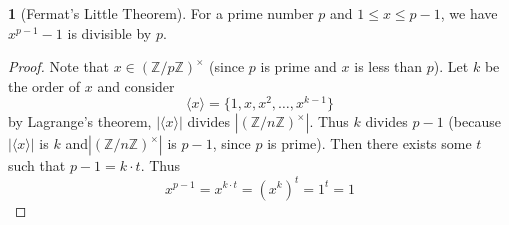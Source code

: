 \documentclass[12pt]{article}
\theoremstyle{definition}
\newtheorem{theorem}{\color{ForestGreen}{\textbf{Theorem}}}
\theoremstyle{definition}
\begin{document}
\begin{theorem}[Fermat's Little Theorem]
	For a prime number $p$ and $1 \leq x \leq p-1$, we have $x^{p-1} - 1$ is divisible by $p$.
\end{theorem}
\begin{proof}
	Note that $x \in (\mathbb{Z}/p \mathbb{Z})^{\times}$ (since $p$ is prime and $x$ is less than $p$). Let $k$ be the order of $x$ and consider 
	\begin{equation}
		\langle x \rangle = \{1,x,x^2,\ldots,x^{k-1}\}
	\end{equation}
	by Lagrange's theorem, $|\langle x \rangle|$ divides $|(\mathbb{Z}/n \mathbb{Z})^{\times}|$. Thus $k$ divides $p-1$ (because $|\langle x \rangle|$ is $k$ and$|(\mathbb{Z}/n \mathbb{Z})^{\times}|$ is $p-1$, since $p$ is prime). Then there exists some $t$ such that $p-1 = k \cdot t$. Thus
	\begin{equation}
		x^{p-1} = x^{k\cdot t} = (x^k)^t = 1^t = 1 \tag{mod $p$}
	\end{equation}
\end{proof}
\end{document}
